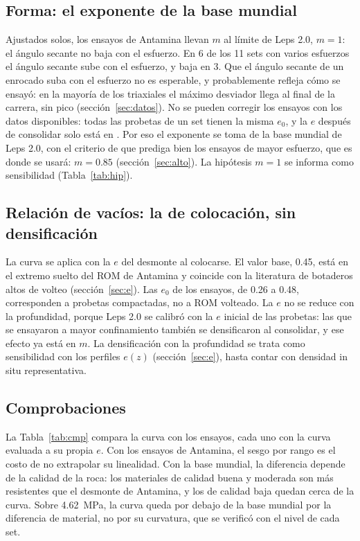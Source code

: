 \documentclass[11pt,letterpaper]{article}
\begin{document}
\subsection{Forma: el exponente de la base mundial}
Ajustados solos, los ensayos de Antamina llevan $m$ al límite de Leps 2.0, $m = 1$: el ángulo secante no baja con el esfuerzo. En 6 de los 11 sets con varios esfuerzos el ángulo secante sube con el esfuerzo, y baja en 3. Que el ángulo secante de un enrocado suba con el esfuerzo no es esperable, y probablemente refleja cómo se ensayó: en la mayoría de los triaxiales el máximo desviador llega al final de la carrera, sin pico (sección~\ref{sec:datos}). No se pueden corregir los ensayos con los datos disponibles: todas las probetas de un set tienen la misma $e_0$, y la $e$ después de consolidar solo está en \citet{g2021}. Por eso el exponente se toma de la base mundial de Leps 2.0, con el criterio de que prediga bien los ensayos de mayor esfuerzo, que es donde se usará: $m = 0.85$ (sección~\ref{sec:alto}). La hipótesis $m = 1$ se informa como sensibilidad (Tabla~\ref{tab:hip}).

\subsection{Relación de vacíos: la de colocación, sin densificación}
La curva se aplica con la $e$ del desmonte al colocarse. El valor base, 0.45, está en el extremo suelto del ROM de Antamina y coincide con la literatura de botaderos altos de volteo (sección~\ref{sec:e}). Las $e_0$ de los ensayos, de 0.26 a 0.48, corresponden a probetas compactadas, no a ROM volteado. La $e$ no se reduce con la profundidad, porque Leps 2.0 se calibró con la $e$ inicial de las probetas: las que se ensayaron a mayor confinamiento también se densificaron al consolidar, y ese efecto ya está en $m$. La densificación con la profundidad se trata como sensibilidad con los perfiles $e(z)$ (sección~\ref{sec:e}), hasta contar con densidad in situ representativa.

\subsection{Comprobaciones}
La Tabla~\ref{tab:cmp} compara la curva con los ensayos, cada uno con la curva evaluada a su propia $e$. Con los ensayos de Antamina, el sesgo por rango es el costo de no extrapolar su linealidad. Con la base mundial, la diferencia depende de la calidad de la roca: los materiales de calidad buena y moderada son más resistentes que el desmonte de Antamina, y los de calidad baja quedan cerca de la curva. Sobre 4.62~MPa, la curva queda por debajo de la base mundial por la diferencia de material, no por su curvatura, que se verificó con el nivel de cada set.
\end{document}
